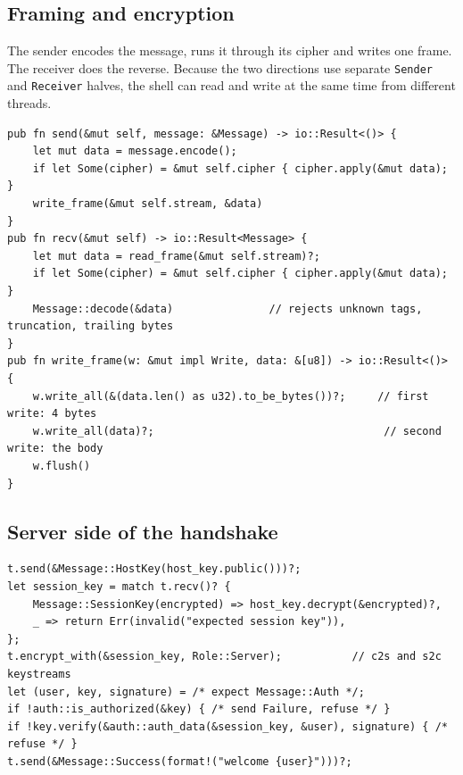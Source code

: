 \documentclass[11pt,a4paper]{article}
\begin{document}
\subsection{Framing and encryption}
\label{sec:framing}

The sender encodes the message, runs it through its cipher and writes one
frame. The receiver does the reverse. Because the two directions use separate
\texttt{Sender} and \texttt{Receiver} halves, the shell can read and write at
the same time from different threads.

\begin{lstlisting}[caption={Encrypted send and receive (\texttt{transport.rs}) and frame writing (\texttt{packet.rs}).}]
pub fn send(&mut self, message: &Message) -> io::Result<()> {
    let mut data = message.encode();
    if let Some(cipher) = &mut self.cipher { cipher.apply(&mut data); }
    write_frame(&mut self.stream, &data)
}
pub fn recv(&mut self) -> io::Result<Message> {
    let mut data = read_frame(&mut self.stream)?;
    if let Some(cipher) = &mut self.cipher { cipher.apply(&mut data); }
    Message::decode(&data)               // rejects unknown tags, truncation, trailing bytes
}
pub fn write_frame(w: &mut impl Write, data: &[u8]) -> io::Result<()> {
    w.write_all(&(data.len() as u32).to_be_bytes())?;     // first write: 4 bytes
    w.write_all(data)?;                                    // second write: the body
    w.flush()
}
\end{lstlisting}

\subsection{Server side of the handshake}

\begin{lstlisting}[caption={\texttt{handshake::server} (\texttt{handshake.rs}), shortened.}]
t.send(&Message::HostKey(host_key.public()))?;
let session_key = match t.recv()? {
    Message::SessionKey(encrypted) => host_key.decrypt(&encrypted)?,
    _ => return Err(invalid("expected session key")),
};
t.encrypt_with(&session_key, Role::Server);           // c2s and s2c keystreams
let (user, key, signature) = /* expect Message::Auth */;
if !auth::is_authorized(&key) { /* send Failure, refuse */ }
if !key.verify(&auth::auth_data(&session_key, &user), signature) { /* refuse */ }
t.send(&Message::Success(format!("welcome {user}")))?;
\end{lstlisting}
\end{document}
